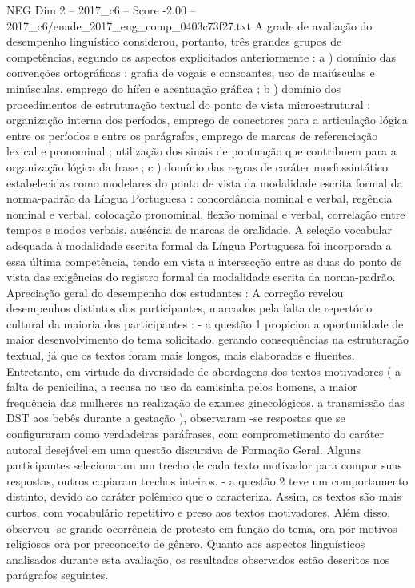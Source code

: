 \begin{textsample}{NEG Dim 2 – 2017\_c6 – Score -2.00 – 2017\_c6/enade\_2017\_eng\_comp\_0403c73f27.txt}
A grade de avaliação do desempenho linguístico considerou, portanto, três grandes grupos de competências, segundo os aspectos explicitados anteriormente : a ) domínio das convenções ortográficas : grafia de vogais e consoantes, uso de maiúsculas e minúsculas, emprego do hífen e acentuação gráfica ; b ) domínio dos procedimentos de estruturação textual do ponto de vista microestrutural : organização interna dos períodos, emprego de conectores para a articulação lógica entre os períodos e entre os parágrafos, emprego de marcas de referenciação lexical e pronominal ; utilização dos sinais de pontuação que contribuem para a organização lógica da frase ; c ) domínio das regras de caráter morfossintático estabelecidas como modelares do ponto de vista da modalidade escrita formal da norma-padrão da Língua Portuguesa : concordância nominal e verbal, regência nominal e verbal, colocação pronominal, flexão nominal e verbal, correlação entre tempos e modos verbais, ausência de marcas de oralidade.
A seleção vocabular adequada à modalidade escrita formal da Língua Portuguesa foi incorporada a essa última competência, tendo em vista a intersecção entre as duas do ponto de vista das exigências do registro formal da modalidade escrita da norma-padrão.
Apreciação geral do desempenho dos estudantes : A correção revelou desempenhos distintos dos participantes, marcados pela falta de repertório cultural da maioria dos participantes : - a questão 1 propiciou a oportunidade de maior desenvolvimento do tema solicitado, gerando consequências na estruturação textual, já que os textos foram mais longos, mais elaborados e fluentes.
Entretanto, em virtude da diversidade de abordagens dos textos motivadores ( a falta de penicilina, a recusa no uso da camisinha pelos homens, a maior frequência das mulheres na realização de exames ginecológicos, a transmissão das DST aos bebês durante a gestação ), observaram -se respostas que se configuraram como verdadeiras paráfrases, com comprometimento do caráter autoral desejável em uma questão discursiva de Formação Geral.
Alguns participantes selecionaram um trecho de cada texto motivador para compor suas respostas, outros copiaram trechos inteiros. - a questão 2 teve um comportamento distinto, devido ao caráter polêmico que o caracteriza.
Assim, os textos são mais curtos, com vocabulário repetitivo e preso aos textos motivadores.
Além disso, observou -se grande ocorrência de protesto em função do tema, ora por motivos religiosos ora por preconceito de gênero.
Quanto aos aspectos linguísticos analisados durante esta avaliação, os resultados observados estão descritos nos parágrafos seguintes.

\end{textsample}
